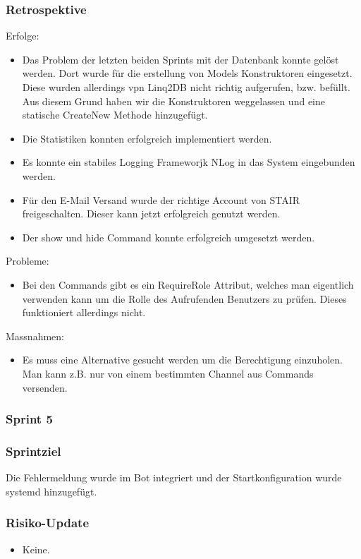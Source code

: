 \documentclass[a4paper, table]{article}
\begin{document}
\subsubsection*{Retrospektive}
Erfolge:
\begin{itemize}
    \item Das Problem der letzten beiden Sprints mit der Datenbank konnte gelöst werden.
    Dort wurde für die erstellung von Models Konstruktoren eingesetzt.
    Diese wurden allerdings vpn Linq2DB nicht richtig aufgerufen, bzw. befüllt.
    Aus diesem Grund haben wir die Konstruktoren weggelassen und eine statische CreateNew Methode hinzugefügt.
    \item Die Statistiken konnten erfolgreich implementiert werden.
    \item Es konnte ein stabiles Logging Frameworjk NLog in das System eingebunden werden.
    \item Für den E-Mail Versand wurde der richtige Account von STAIR freigeschalten.
    Dieser kann jetzt erfolgreich genutzt werden.
    \item Der show und hide Command konnte erfolgreich umgesetzt werden.
\end{itemize}
Probleme:
\begin{itemize}
    \item Bei den Commands gibt es ein RequireRole Attribut, welches man eigentlich verwenden kann um die Rolle des Aufrufenden Benutzers zu prüfen.
    Dieses funktioniert allerdings nicht.
\end{itemize}
Massnahmen:
\begin{itemize}
    \item Es muss eine Alternative gesucht werden um die Berechtigung einzuholen.
    Man kann z.B. nur von einem bestimmten Channel aus Commands versenden.
\end{itemize}

\subsubsection{Sprint 5}
\subsubsection*{Sprintziel}
Die Fehlermeldung wurde im Bot integriert und der Startkonfiguration wurde systemd hinzugefügt.

\subsubsection*{Risiko-Update}
\begin{itemize}
    \item Keine.
\end{itemize}
\end{document}
